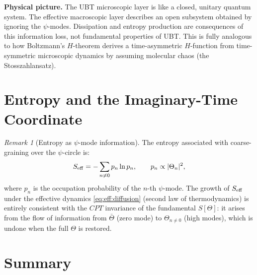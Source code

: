 \documentclass[12pt,a4paper]{article}
\theoremstyle{definition}
\theoremstyle{remark}
\newtheorem{remark}[theorem]{Remark}
\begin{document}
\begin{insightbox}
\textbf{Physical picture.}
The UBT microscopic layer is like a closed, unitary quantum system.
The effective macroscopic layer describes an open subsystem obtained by
ignoring the $\psi$-modes.  Dissipation and entropy production are consequences
of this information loss, not fundamental properties of UBT.
This is fully analogous to how Boltzmann's $H$-theorem derives a
time-asymmetric $H$-function from time-symmetric microscopic dynamics by
assuming molecular chaos (the Stosszahlansatz).
\end{insightbox}

\section{Entropy and the Imaginary-Time Coordinate}
\label{sec:eff:entropy}

\begin{remark}[Entropy as $\psi$-mode information]
The entropy associated with coarse-graining over the $\psi$-circle is:
\begin{equation}
  S_{\rm eff} = -\sum_{n\neq0} p_n \ln p_n,
  \qquad p_n \propto |\Theta_n|^2,
  \label{eq:eff:entropy}
\end{equation}
where $p_n$ is the occupation probability of the $n$-th $\psi$-mode.
The growth of $S_{\rm eff}$ under the effective dynamics \eqref{eq:eff:diffusion}
(second law of thermodynamics) is entirely consistent with the $CPT$ invariance
of the fundamental $S[\Theta]$: it arises from the flow of information from
$\bar\Theta$ (zero mode) to $\Theta_{n\neq0}$ (high modes), which is
undone when the full $\Theta$ is restored.
\end{remark}

\section{Summary}
\label{sec:eff:summary}
\end{document}
